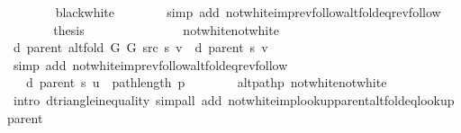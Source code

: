 \begin{isabellebody}
\ \ \ \ \ \ \isamarkupfalse%
\ black{\isacharunderscore}{\kern0pt}white\isanewline
\ \ \ \ \ \ \isamarkupfalse%
\ {\isacharparenleft}{\kern0pt}simp\ add{\isacharcolon}{\kern0pt}\ not{\isacharunderscore}{\kern0pt}white{\isacharunderscore}{\kern0pt}imp{\isacharunderscore}{\kern0pt}rev{\isacharunderscore}{\kern0pt}follow{\isacharunderscore}{\kern0pt}alt{\isacharunderscore}{\kern0pt}fold{\isacharunderscore}{\kern0pt}eq{\isacharunderscore}{\kern0pt}rev{\isacharunderscore}{\kern0pt}follow{\isacharparenright}{\kern0pt}\isanewline
\ \ \ \ \isamarkupfalse%
\ \isamarkupfalse%
\ {\isacharquery}{\kern0pt}thesis\isanewline
\ \ \ \ \ \ \isacommand{{\isachardot}{\kern0pt}}\isamarkupfalse%
\isanewline
\ \ \isamarkupfalse%
\isanewline
\ \ \ \ \isamarkupfalse%
\ not{\isacharunderscore}{\kern0pt}white{\isacharunderscore}{\kern0pt}not{\isacharunderscore}{\kern0pt}white\isanewline
\ \ \ \ \isamarkupfalse%
\ {\isachardoublequoteopen}d\ {\isacharparenleft}{\kern0pt}parent\ {\isacharparenleft}{\kern0pt}alt{\isacharunderscore}{\kern0pt}fold\ G{}\ G{}\ src\ s{\isacharparenright}{\kern0pt}{\isacharparenright}{\kern0pt}\ v\ {\isacharequal}{\kern0pt}\ d\ {\isacharparenleft}{\kern0pt}parent\ s{\isacharparenright}{\kern0pt}\ v{\isachardoublequoteclose}\isanewline
\ \ \ \ \ \ \isamarkupfalse%
\ {\isacharparenleft}{\kern0pt}simp\ add{\isacharcolon}{\kern0pt}\ not{\isacharunderscore}{\kern0pt}white{\isacharunderscore}{\kern0pt}imp{\isacharunderscore}{\kern0pt}rev{\isacharunderscore}{\kern0pt}follow{\isacharunderscore}{\kern0pt}alt{\isacharunderscore}{\kern0pt}fold{\isacharunderscore}{\kern0pt}eq{\isacharunderscore}{\kern0pt}rev{\isacharunderscore}{\kern0pt}follow{\isacharparenright}{\kern0pt}\isanewline
\ \ \ \ \isamarkupfalse%
\ \isamarkupfalse%
\ {\isachardoublequoteopen}{\isachardot}{\kern0pt}{\isachardot}{\kern0pt}{\isachardot}{\kern0pt}\ {\isasymle}\ d\ {\isacharparenleft}{\kern0pt}parent\ s{\isacharparenright}{\kern0pt}\ u\ {\isacharplus}{\kern0pt}\ path{\isacharunderscore}{\kern0pt}length\ p{\isachardoublequoteclose}\isanewline
\ \ \ \ \ \ \isamarkupfalse%
\ alt{\isacharunderscore}{\kern0pt}path{\isacharunderscore}{\kern0pt}p\ not{\isacharunderscore}{\kern0pt}white{\isacharunderscore}{\kern0pt}not{\isacharunderscore}{\kern0pt}white\isanewline
\ \ \ \ \ \ \isamarkupfalse%
\ {\isacharparenleft}{\kern0pt}intro\ d{\isacharunderscore}{\kern0pt}triangle{\isacharunderscore}{\kern0pt}inequality{\isacharparenright}{\kern0pt}\ {\isacharparenleft}{\kern0pt}simp{\isacharunderscore}{\kern0pt}all\ add{\isacharcolon}{\kern0pt}\ not{\isacharunderscore}{\kern0pt}white{\isacharunderscore}{\kern0pt}imp{\isacharunderscore}{\kern0pt}lookup{\isacharunderscore}{\kern0pt}parent{\isacharunderscore}{\kern0pt}alt{\isacharunderscore}{\kern0pt}fold{\isacharunderscore}{\kern0pt}eq{\isacharunderscore}{\kern0pt}lookup{\isacharunderscore}{\kern0pt}parent{\isacharparenright}{\kern0pt}\isanewline

\end{isabellebody}
